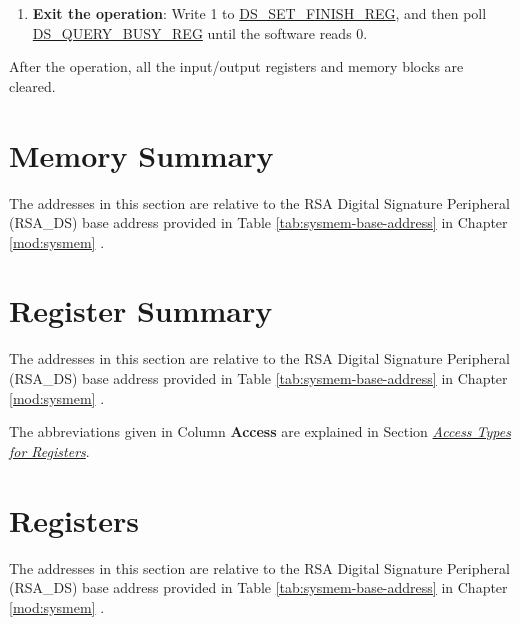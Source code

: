 \documentclass[main\_\_EN.tex]{subfiles}
\begin{document}
\begin{enumerate}
    \item {\bfseries Exit the operation\label{other:digsig-step-exit}}: Write 1 to \hyperref[regdesc:DSSETFINISHREG]{DS\_SET\_FINISH\_REG}, and then poll \hyperref[regdesc:DSQUERYBUSYREG]{DS\_QUERY\_BUSY\_REG} until the software reads 0.

\end{enumerate}

After the operation, all the input/output registers and memory blocks are cleared.


\newpage
\section{Memory Summary}
\label{sec:digsig-mem-summ}

The addresses in this section are relative to the RSA Digital Signature Peripheral (RSA\_DS) base address provided in Table \ref{tab:sysmem-base-address} in Chapter \ref{mod:sysmem} \textit{}.






\newpage
\hypertarget{digsig-reg-summ}{}
\section{Register Summary}
\label{sec:digsig-reg-summ}

The addresses in this section are relative to the RSA Digital Signature Peripheral (RSA\_DS) base address provided in Table \ref{tab:sysmem-base-address} in Chapter \ref{mod:sysmem} \textit{}.

The abbreviations given in Column \textbf{Access} are explained in Section \hyperref[glossary-access-types]{\textit{Access Types for Registers}}.






\newpage
\section{Registers}

The addresses in this section are relative to the RSA Digital Signature Peripheral (RSA\_DS) base address provided in Table \ref{tab:sysmem-base-address} in Chapter \ref{mod:sysmem} \textit{}.


\end{document}
